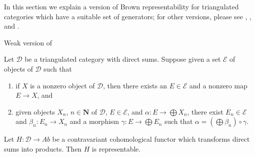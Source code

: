 \noindent
In this section we explain a version of Brown representability
for triangulated categories which have a suitable set of generators;
for other versions, please see \cite{Franke}, \cite{Neeman}, and \cite{Krause}.

\begin{lemma}
\label{lemma-brown-bis}
\begin{reference}
Weak version of \cite[Theorem A]{Krause}
\end{reference}
Let $\mathcal{D}$ be a triangulated category with direct sums.
Suppose given a set $\mathcal{E}$ of objects of $\mathcal{D}$ such that
\begin{enumerate}
\item if $X$ is a nonzero object of $\mathcal{D}$, then there exists
an $E \in \mathcal{E}$ and a nonzero map $E \to X$, and
\item given objects $X_n$, $n \in \mathbf{N}$ of $\mathcal{D}$,
$E \in \mathcal{E}$, and $\alpha : E \to \bigoplus X_n$,
there exist $E_n \in \mathcal{E}$ and $\beta_n : E_n \to X_n$ and a morphism
$\gamma : E \to \bigoplus E_n$ such that
$\alpha = (\bigoplus \beta_n) \circ \gamma$.
\end{enumerate}
Let $H : \mathcal{D} \to \textit{Ab}$ be a contravariant cohomological functor
which transforms direct sums into products. Then $H$ is representable.
\end{lemma}

